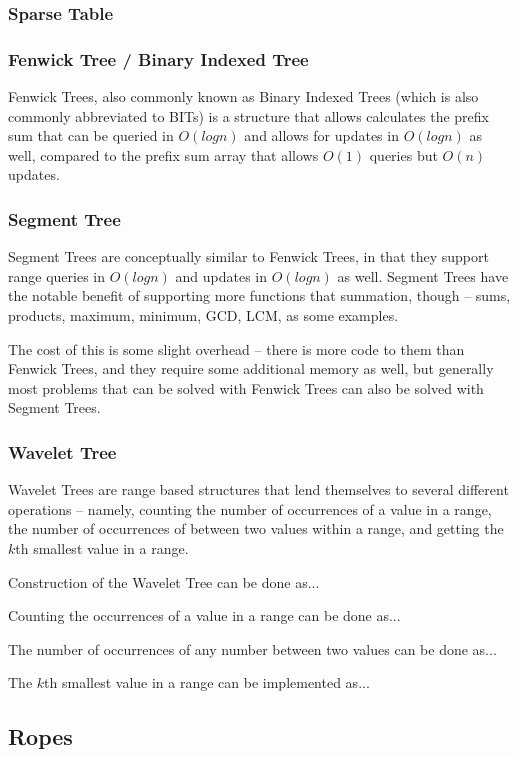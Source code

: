 \subsubsection{Sparse Table}
\subsubsection{Fenwick Tree / Binary Indexed Tree}

Fenwick Trees, also commonly known as Binary Indexed Trees (which is also commonly abbreviated to BITs) is a structure that allows calculates the prefix sum that can be queried in $O(log n)$ and allows for updates in $O(log n)$ as well, compared to the prefix sum array that allows $O(1)$ queries but $O(n)$ updates.

\subsubsection{Segment Tree}

Segment Trees are conceptually similar to Fenwick Trees, in that they support range queries in $O(log n)$ and updates in $O(log n)$ as well. Segment Trees have the notable benefit of supporting more functions that summation, though -- sums, products, maximum, minimum, GCD, LCM, as some examples.

The cost of this is some slight overhead -- there is more code to them than Fenwick Trees, and they require some additional memory as well, but generally most problems that can be solved with Fenwick Trees can also be solved with Segment Trees.

\subsubsection{Wavelet Tree}

Wavelet Trees are range based structures that lend themselves to several different operations -- namely, counting the number of occurrences of a value in a range, the number of occurrences of between two values within a range, and getting the $k$th smallest value in a range.

Construction of the Wavelet Tree can be done as...

Counting the occurrences of a value in a range can be done as...

The number of occurrences of any number between two values can be done as...

The $k$th smallest value in a range can be implemented as...

\subsection{Ropes}
